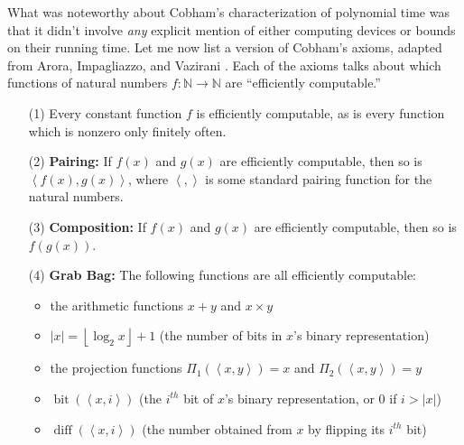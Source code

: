 \documentclass[12pt,onecolumn]{article}%
\begin{document}
What was noteworthy about Cobham's characterization of polynomial time was
that it didn't involve \textit{any} explicit mention of either computing
devices or bounds on their running time. Let me now list a version of
Cobham's axioms, adapted from Arora, Impagliazzo, and Vazirani \cite{aiv}.
 Each of the axioms talks about which functions of natural numbers
$f:\mathbb{N}\rightarrow\mathbb{N}$ are \textquotedblleft efficiently
computable.\textquotedblright\ 

\begin{enumerate}
\item[(1)] Every constant function $f$ is efficiently computable, as is every
function which is nonzero only finitely often.

\item[(2)] \textbf{Pairing:} If $f\left(  x\right)  $ and $g\left(  x\right)
$ are efficiently computable, then so is $\left\langle f\left(  x\right)
,g\left(  x\right)  \right\rangle $, where $\left\langle ,\right\rangle $ is
some standard pairing function for the natural numbers.

\item[(3)] \textbf{Composition:} If $f\left(  x\right)  $ and $g\left(
x\right)  $ are efficiently computable, then so is $f\left(  g\left(
x\right)  \right)  $.

\item[(4)] \textbf{Grab Bag:} The following functions are all efficiently computable:

\begin{itemize}
\item the arithmetic functions $x+y$ and $x\times y$

\item $\left\vert x\right\vert =\left\lfloor \log_{2}x\right\rfloor +1$ (the
number of bits in $x$'s binary representation)

\item the projection functions $\Pi_{1}\left(  \left\langle x,y\right\rangle
\right)  =x$ and $\Pi_{2}\left(  \left\langle x,y\right\rangle \right)  =y$

\item $\operatorname*{bit}\left(  \left\langle x,i\right\rangle \right)
$ (the $i^{th}$ bit of $x$'s binary representation, or $0$ if $i>\left\vert
x\right\vert $)

\item $\operatorname*{diff}\left(  \left\langle x,i\right\rangle \right)  $
(the number obtained from $x$ by flipping its $i^{th}$ bit)


\end{itemize}
\end{enumerate}
\end{document}
